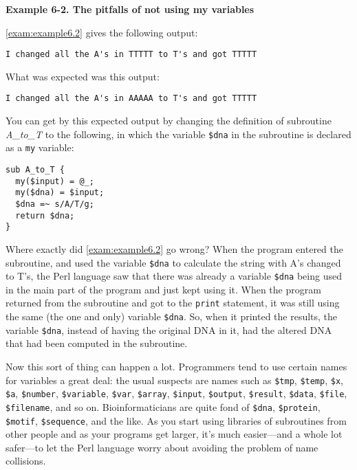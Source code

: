 \textbf{Example 6-2. The pitfalls of not using my variables}


\autoref{exam:example6.2} gives the following output:

\begin{lstlisting}
I changed all the A's in TTTTT to T's and got TTTTT 
\end{lstlisting}

What was expected was this output:

\begin{lstlisting}
I changed all the A's in AAAAA to T's and got TTTTT 
\end{lstlisting}

You can get by this expected output by changing the definition of subroutine \textit{A\_to\_T} to the following, in which the variable \verb|$dna| in the subroutine is declared as a \verb|my| variable: 

\begin{lstlisting}
sub A_to_T {
  my($input) = @_;
  my($dna) = $input;
  $dna =~ s/A/T/g;
  return $dna;
}
\end{lstlisting}

Where exactly did \autoref{exam:example6.2} go wrong? When the program entered the subroutine, and used the variable \verb|$dna| to calculate the string with A's changed to T's, the Perl language saw that there was already a variable \verb|$dna| being used in the main part of the program and just kept using it. When the program returned from the subroutine and got to the \verb|print| statement, it was still using the same (the one and only) variable \verb|$dna|. So, when it printed the results, the variable \verb|$dna|, instead of having the original DNA in it, had the altered DNA that had been computed in the subroutine.

Now this sort of thing can happen a lot. Programmers tend to use certain names for variables a great deal: the usual suspects are names such as \verb|$tmp|, \verb|$temp|, \verb|$x|, \verb|$a|, \verb|$number|, \verb|$variable|, \verb|$var|, \verb|$array|, \verb|$input|, \verb|$output|, \verb|$result|, \verb|$data|, \verb|$file|, \verb|$filename|, and so on. Bioinformaticians are quite fond of \verb|$dna|, \verb|$protein|, \verb|$motif|, \verb|$sequence|, and the like. As you start using libraries of subroutines from other people and as your programs get larger, it's much easier—and a whole lot safer—to let the Perl language worry about avoiding the problem of name collisions.

